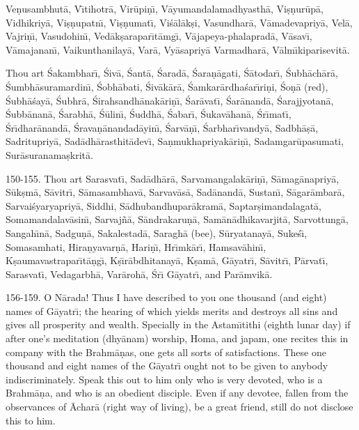 Ve\d{n}usambhut\=a, V\={\i}tihotr\=a, Vir\=upi\d{n}\={\i}, V\=ayumandalamadhyasth\=a, Vi\d{s}\d{n}ur\=up\=a, Vidhikriy\=a, Vi\d{s}\d{n}upatn\={\i}, Vi\d{s}\d{n}umat\={\i}, Vi\'s\=al\=ak\d{s}i, Vasundhar\=a, V\=amadevapriy\=a, Vel\=a, Vajri\d{n}\={\i}, Vasudohin\={\i}, Ved\=ak\d{s}arapar\={\i}t\=amg\={\i}, V\=ajapeya-phalaprad\=a, V\=asav\={\i}, V\=amajanan\={\i}, Vaikunthanilay\=a, Var\=a, Vy\=asapriy\=a Varmadhar\=a, V\=alm\={\i}kiparisevit\=a.

Thou art \'Sakambhar\={\i}, \'Siv\=a, \'Sant\=a, \'Sarad\=a, \'Sara\d{n}\=agati, \'S\=atodar\={\i}, \'Subh\=ach\=ar\=a, \'Sumbh\=asuramardin\={\i}, \'Sobh\=abati, \'Siv\=ak\=ar\=a, \'Samkar\=ardha\'sar\={\i}ri\d{n}i, \'So\d{n}\=a (red), \'Subh\=a\'say\=a, \'Subhr\=a, \'Sirahsandh\=anak\=ari\d{n}\={\i}, \'Sar\=avat\={\i}, \'Sar\=anand\=a, \'Sarajjyotan\=a, \'Subb\=anan\=a, \'Sarabh\=a, \'S\=ulin\={\i}, \'Suddh\=a, \'Sabar\={\i}, \'Sukav\=ahan\=a, \'Sr\={\i}mat\={\i}, \'Sr\={\i}dhar\=anand\=a, \'Srava\d{n}\=anandad\=ayin\={\i}, \'Sarv\=a\d{n}\={\i}, \'Sarbhar\={\i}vandy\=a, Sadbh\=a\d{s}\=a, Sadritupriy\=a, Sad\=adh\=arasthit\=adev\={\i}, Sa\d{n}mukhapriyak\=ari\d{n}\={\i}, Sadamgar\=upasumati, Sur\=asuranama\d{s}krit\=a.

150-155. Thou art Sarasvat\={\i}, Sad\=adh\=ar\=a, Sarvamangalak\=ari\d{n}\={\i}, S\=amag\=anapriy\=a, S\=uk\d{s}m\=a, S\=avitr\={\i}, S\=amasambhav\=a, Sarvav\=as\=a, Sad\=anand\=a, Sustan\={\i}, S\=agar\=ambar\=a, Sarvai\'syaryapriy\=a, Siddhi, S\=adhubandhupar\=akram\=a, Saptar\d{s}imandalagat\=a, Somamandalav\=asin\={\i}, Sarvaj\~n\=a, S\=andrakaru\d{n}\=a, Sam\=an\=adhikavarjit\=a, Sarvottung\=a, Sangah\={\i}n\=a, Sadgu\d{n}\=a, Sakalestad\=a, Saragh\=a (bee), S\=uryatanay\=a, Suke\'s\={\i}, Somasamhati, Hira\d{n}yavar\d{n}\=a, Hari\d{n}\={\i}, Hr\={\i}mk\=ar\={\i}, Hamsav\=ahin\={\i}, K\d{s}aumavastrapar\={\i}t\=a\d{n}g\={\i}, K\d{s}\={\i}r\=abdhitanay\=a, K\d{s}am\=a, G\=ayatr\={\i}, S\=avitr\={\i}, P\=arvat\={\i}, Sarasvat\={\i}, Vedagarbh\=a, Var\=aroh\=a, \'Sr\={\i} G\=ayatr\={\i}, and Par\=amvik\=a.

156-159. O N\=arada! Thus I have described to you one thousand (and eight) names of G\=ayatr\={\i}; the hearing of which yields merits and destroys all sins and gives all prosperity and wealth. Specially in the Astam\={\i}tithi (eighth lunar day) if after one's meditation (dhy\=anam) worship, Homa, and japam, one recites this in company with the Brahm\=a\d{n}as, one gets all sorts of satisfactions. These one thousand and eight names of the G\=ayatr\={\i} ought not to be given to anybody indiscriminately. Speak this out to him only who is very devoted, who is a Brahm\=a\d{n}a, and who is an obedient disciple. Even if any devotee, fallen from the observances of \=Achar\=a (right way of living), be a great friend, still do not disclose this to him.

